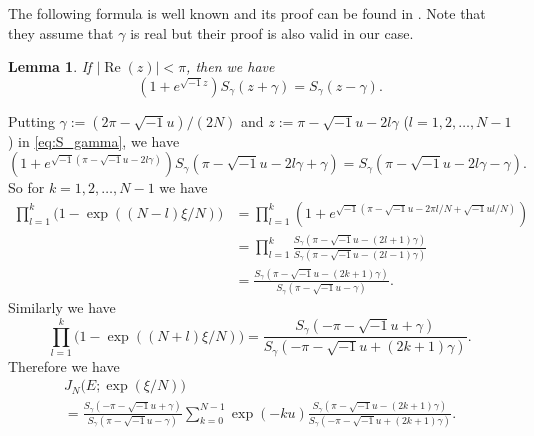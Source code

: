 \documentclass[a4paper]{amsart}
\theoremstyle{plain}
\newtheorem{lem}[thm]{Lemma}
\theoremstyle{definition}
\theoremstyle{remark}
\newcommand{\Z}{\mathbb{Z}}
\renewcommand{\Re}{\operatorname{Re}}
\numberwithin{equation}{section}
\begin{document}
The following formula is well known and its proof can be found in \cite[p.~530]{Andersen/Hansen:JKNOT2006}.
Note that they assume that $\gamma$ is real but their proof is also valid in our case.
\begin{lem}
If $|\Re(z)|<\pi$, then we have
\begin{equation}\label{eq:S_gamma}
  \left(1+e^{\sqrt{-1}z}\right)S_{\gamma}(z+\gamma)
  =
  S_{\gamma}(z-\gamma).
\end{equation}
\end{lem}

Putting $\gamma:=(2\pi-\sqrt{-1}u)/(2N)$ and $z:=\pi-\sqrt{-1}u-2l\gamma$ ($l=1,2,\dots,N-1$) in \eqref{eq:S_gamma}, we have
\begin{equation*}
  \left(1+e^{\sqrt{-1}(\pi-\sqrt{-1}u-2l\gamma)}\right)
  S_{\gamma}(\pi-\sqrt{-1}u-2l\gamma+\gamma)
  =
  S_{\gamma}(\pi-\sqrt{-1}u-2l\gamma-\gamma).
\end{equation*}
So for $k=1,2,\dots,N-1$ we have
\begin{equation*}
\begin{split}
  \prod_{l=1}^{k}\bigl(1-\exp((N-l)\xi/N)\bigr)
  &=
  \prod_{l=1}^{k}
  \left(1+e^{\sqrt{-1}(\pi-\sqrt{-1}u-2\pi l/N+\sqrt{-1}ul/N)}\right)
  \\
  &=
  \prod_{l=1}^{k}
  \frac{S_{\gamma}(\pi-\sqrt{-1}u-(2l+1)\gamma)}
       {S_{\gamma}(\pi-\sqrt{-1}u-(2l-1)\gamma)}
  \\
  &=
  \frac{S_{\gamma}(\pi-\sqrt{-1}u-(2k+1)\gamma)}
       {S_{\gamma}(\pi-\sqrt{-1}u-\gamma)}.
\end{split}
\end{equation*}
Similarly we have
\begin{equation*}
  \prod_{l=1}^{k}\bigl(1-\exp((N+l)\xi/N)\bigr)
  =
  \frac{S_{\gamma}(-\pi-\sqrt{-1}u+\gamma)}
       {S_{\gamma}(-\pi-\sqrt{-1}u+(2k+1)\gamma)}.
\end{equation*}
Therefore we have
\begin{multline*}
  J_N\bigl(E;\exp(\xi/N)\bigr)
  \\
  =
  \frac{S_{\gamma}(-\pi-\sqrt{-1}u+\gamma)}{S_{\gamma}(\pi-\sqrt{-1}u-\gamma)}
  \sum_{k=0}^{N-1}
  \exp(-ku)
  \frac{S_{\gamma}(\pi-\sqrt{-1}u-(2k+1)\gamma)}
       {S_{\gamma}(-\pi-\sqrt{-1}u+(2k+1)\gamma)}.
\end{multline*}
\end{document}
